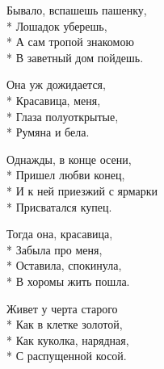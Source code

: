 \medskip

\begin{minipage}{\linewidth}
Бывало, вспашешь пашенку,\\*
Лошадок уберешь,\\*
А сам тропой знакомою\\*
В заветный дом пойдешь.\\
\end{minipage}\par\medskip\nobreak

\medskip

\begin{minipage}{\linewidth}
Она уж дожидается,\\*
Красавица, меня,\\*
Глаза полуоткрытые,\\*
Румяна и бела.\\
\end{minipage}\par\medskip\nobreak

\medskip

\begin{minipage}{\linewidth}
Однажды, в конце осени,\\*
Пришел любви конец,\\*
И к ней приезжий с ярмарки\\*
Присватался купец.\\
\end{minipage}\par\medskip\nobreak

\medskip

\begin{minipage}{\linewidth}
Тогда она, красавица,\\*
Забыла про меня,\\*
Оставила, спокинула,\\*
В хоромы жить пошла.\\
\end{minipage}\par\medskip\nobreak

\medskip

\begin{minipage}{\linewidth}
Живет у черта старого\\*
Как в клетке золотой,\\*
Как куколка, нарядная,\\*
С распущенной косой.\\
\end{minipage}\par\medskip\nobreak

